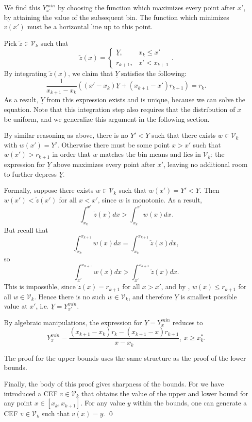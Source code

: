 We find this $Y_{x'}^{min}$ by choosing the function which maximizes
every point after $x'$, by attaining the value of the
subsequent bin. The function which minimizes $v(x')$ must be a
horizontal line up to this point. 

Pick $\tilde{z} \in \mathcal{V}_k$ such that 
$$ 
\tilde{z}(x) = \begin{cases}
\underline{Y}, &x_k \leq x' \\
r_{k+1}, &x' < x_{k+1} 
\end{cases}. 
$$
By integrating $\tilde{z}(x)$, we claim that $\underline{Y}$ satisfies the following: 
$$ \frac{1}{x_{k+1} - x_k} \left( \left(x' - x_k\right) \underline{Y} + \left(x_{k+1} -
x'\right) r_{k+1}\right) = r_k .$$ As a result, $\underline{Y}$ from this expression exists and is unique,
because we can solve the equation. Note that this integration step
also requires that the distribution of $x$ be uniform, and we
generalize this argument in the following section. 

By similar reasoning as above, there
is no $Y' < \underline{Y}$ such that there exists $w \in \mathcal{V}_k$ with 
$w(x') = Y'$. Otherwise there must be some point $x
> x'$ such that $w(x') > r_{k+1}$ in order that $w$ matches the bin
means and lies in $\mathcal{V}_k$; the expression
for $\underline{Y}$ above maximizes every point after $x'$, leaving no
additional room to further depress $\underline{Y}$. 

Formally, suppose there exists $w \in \mathcal{V}_k$ such that $w(x') =
Y' < \underline{Y}$. Then $w(x') < \tilde{z}(x')$ for all $x < x'$, since $w$ is
monotonic. As a result, $$\int_{x_k}^{x'}\tilde{z}(x)dx
>  \int_{x_k}^{x'}w(x)dx.$$ But recall that 
$$\int_{x_k}^{x_{k+1}} w(x) dx = \int_{x_k}^{x_{k+1}} \tilde{z}(x) dx,$$ so 
$$\int_{x'}^{x_{k+1}} w(x) dx > \int_{x'}^{x_{k+1}} \tilde{z}(x) dx. $$ This is
impossible, since $\tilde{z}(x) = r_{k+1}$ for all $x > x'$, and
by \citet{Manski2002}, $w(x) \leq r_{k+1}$ for all $w \in \mathcal{V}_k$. Hence there
is no such $w \in \mathcal{V}_k$, and therefore $\underline{Y}$ is smallest possible
value at $x'$, i.e. $\underline{Y} = Y_{x'}^{min}$.

By algebraic manipulations, the expression for $\underline{Y} = Y_{x}^{min}$ reduces
to $$Y_{x}^{min} = \frac{ \left(x_{k+1} - x_k\right) r_k  - (x_{k+1}
- x) r_{k+1}}{x - x_k}, \ x \geq x_k^*.$$  

The proof for the upper bounds uses the same structure as the proof of the lower bounds.

Finally, the body of this proof gives sharpness of the bounds. For we
have introduced a CEF $v \in \mathcal{V}_k$ that obtains the value of the upper and lower
bound for any point $x \in [x_k,x_{k+1}]$. For any value $y$ within the
bounds, one can generate a CEF $v \in \mathcal{V}_k$ such that $v(x) =
y$. \qed

